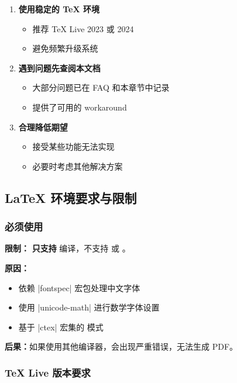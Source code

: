 \begin{enumerate}
  \item \textbf{使用稳定的 \TeX{} 环境}
    \begin{itemize}
      \item 推荐 \TeX{} Live 2023 或 2024
      \item 避免频繁升级系统
    \end{itemize}

  \item \textbf{遇到问题先查阅本文档}
    \begin{itemize}
      \item 大部分问题已在 FAQ 和本章节中记录
      \item 提供了可用的 workaround
    \end{itemize}

  \item \textbf{合理降低期望}
    \begin{itemize}
      \item 接受某些功能无法实现
      \item 必要时考虑其他解决方案
    \end{itemize}
\end{enumerate}


\subsection{\LaTeX{} 环境要求与限制}

\subsubsection{必须使用 \XeLaTeX{}}

\textbf{限制：} \textbf{只支持} \XeLaTeX{} 编译，不支持 \pdfLaTeX{} 或 \LuaLaTeX{}。

\textbf{原因：}

\begin{itemize}
  \item 依赖 |fontspec| 宏包处理中文字体
  \item 使用 |unicode-math| 进行数学字体设置
  \item 基于 |ctex| 宏集的 \XeLaTeX{} 模式
\end{itemize}

\textbf{后果：}如果使用其他编译器，会出现严重错误，无法生成 PDF。

\subsubsection{\TeX{} Live 版本要求}

